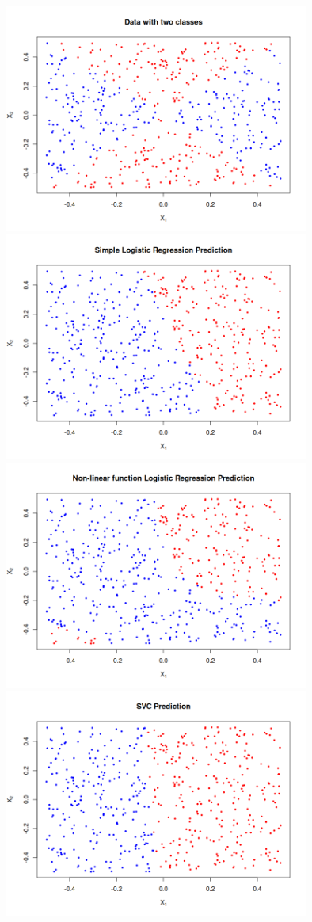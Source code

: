 \documentclass{article}
\begin{document}
\includegraphics[width=0.75\textwidth]{figs/q5-1.png}
\newline
\includegraphics[width=0.75\textwidth]{figs/q5-2.png}
\newline
\includegraphics[width=0.75\textwidth]{figs/q5-3.png}
\newline
\includegraphics[width=0.75\textwidth]{figs/q5-4.png}
\end{document}
